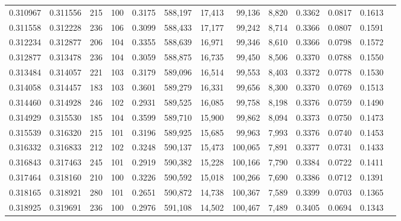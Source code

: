 \begin{tabular}{rrrrrrrrrrrrr}
0.310967 & 0.311556 &   215 & 100 &                                     0.3175 & 588,197 &  17,413 &  99,136 &   8,820 & 0.3362 & 0.0817 & 0.1613 \\
0.311558 & 0.312228 &   236 & 106 &                                     0.3099 & 588,433 &  17,177 &  99,242 &   8,714 & 0.3366 & 0.0807 & 0.1591 \\
0.312234 & 0.312877 &   206 & 104 &                                     0.3355 & 588,639 &  16,971 &  99,346 &   8,610 & 0.3366 & 0.0798 & 0.1572 \\
0.312877 & 0.313478 &   236 & 104 &                                     0.3059 & 588,875 &  16,735 &  99,450 &   8,506 & 0.3370 & 0.0788 & 0.1550 \\
0.313484 & 0.314057 &   221 & 103 &                                     0.3179 & 589,096 &  16,514 &  99,553 &   8,403 & 0.3372 & 0.0778 & 0.1530 \\
0.314058 & 0.314457 &   183 & 103 &                                     0.3601 & 589,279 &  16,331 &  99,656 &   8,300 & 0.3370 & 0.0769 & 0.1513 \\
0.314460 & 0.314928 &   246 & 102 &                                     0.2931 & 589,525 &  16,085 &  99,758 &   8,198 & 0.3376 & 0.0759 & 0.1490 \\
0.314929 & 0.315530 &   185 & 104 &                                     0.3599 & 589,710 &  15,900 &  99,862 &   8,094 & 0.3373 & 0.0750 & 0.1473 \\
0.315539 & 0.316320 &   215 & 101 &                                     0.3196 & 589,925 &  15,685 &  99,963 &   7,993 & 0.3376 & 0.0740 & 0.1453 \\
0.316332 & 0.316833 &   212 & 102 &                                     0.3248 & 590,137 &  15,473 & 100,065 &   7,891 & 0.3377 & 0.0731 & 0.1433 \\
0.316843 & 0.317463 &   245 & 101 &                                     0.2919 & 590,382 &  15,228 & 100,166 &   7,790 & 0.3384 & 0.0722 & 0.1411 \\
0.317464 & 0.318160 &   210 & 100 &                                     0.3226 & 590,592 &  15,018 & 100,266 &   7,690 & 0.3386 & 0.0712 & 0.1391 \\
0.318165 & 0.318921 &   280 & 101 &                                     0.2651 & 590,872 &  14,738 & 100,367 &   7,589 & 0.3399 & 0.0703 & 0.1365 \\
0.318925 & 0.319691 &   236 & 100 &                                     0.2976 & 591,108 &  14,502 & 100,467 &   7,489 & 0.3405 & 0.0694 & 0.1343 \\

\end{tabular}

